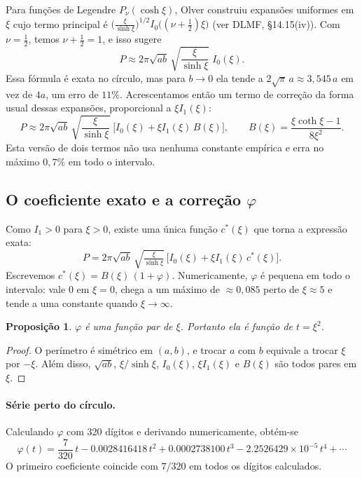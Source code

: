 \documentclass[11pt,a4paper]{article}
\newtheorem{proposicao}[teorema]{Proposição}
\theoremstyle{remark}
\begin{document}
Para funções de Legendre $P_\nu(\cosh\xi)$, Olver construiu expansões
uniformes em $\xi$ cujo termo principal é
$\big(\frac{\xi}{\sinh\xi}\big)^{1/2}I_0\big((\nu+\tfrac12)\xi\big)$
(ver DLMF, \S14.15(iv)). Com $\nu=\frac12$, temos $\nu+\frac12=1$, e isso sugere
\begin{equation}\label{eq:olver1}
P\approx2\pi\sqrt{ab}\,\sqrt{\frac{\xi}{\sinh\xi}}\;I_0(\xi).
\end{equation}
Essa fórmula é exata no círculo, mas para $b\to0$ ela tende a $2\sqrt\pi\,a\approx3{,}545\,a$
em vez de $4a$, um erro de $11\%$. Acrescentamos então um termo de correção da forma usual
dessas expansões, proporcional a $\xi I_1(\xi)$:
\begin{equation}\label{eq:olver2}
P\approx2\pi\sqrt{ab}\,\sqrt{\frac{\xi}{\sinh\xi}}\;\Big[I_0(\xi)+\xi I_1(\xi)\,B(\xi)\Big],
\qquad B(\xi)=\frac{\xi\coth\xi-1}{8\xi^2}.
\end{equation}
Esta versão de dois termos não usa nenhuma constante empírica e erra no máximo
$0{,}7\%$ em todo o intervalo.

\subsection{O coeficiente exato e a correção \texorpdfstring{$\varphi$}{phi}}

Como $I_1>0$ para $\xi>0$, existe uma única função $c^*(\xi)$ que torna a
expressão exata:
\[
P=2\pi\sqrt{ab}\,\sqrt{\tfrac{\xi}{\sinh\xi}}\,\big[I_0(\xi)+\xi I_1(\xi)\,c^*(\xi)\big].
\]
Escrevemos $c^*(\xi)=B(\xi)\,(1+\varphi)$. Numericamente, $\varphi$ é pequena em
todo o intervalo: vale $0$ em $\xi=0$, chega a um máximo de $\approx0{,}085$ perto de $\xi\approx5$ e
tende a uma constante quando $\xi\to\infty$.

\begin{proposicao}\label{prop:par}
$\varphi$ é uma função par de $\xi$. Portanto ela é função de $t=\xi^2$.
\end{proposicao}
\begin{proof}
O perímetro é simétrico em $(a,b)$, e trocar $a$ com $b$ equivale a trocar $\xi$ por $-\xi$.
Além disso, $\sqrt{ab}$, $\xi/\sinh\xi$, $I_0(\xi)$, $\xi I_1(\xi)$ e $B(\xi)$ são todos pares em $\xi$.
\end{proof}

\paragraph{Série perto do círculo.} Calculando $\varphi$ com 320 dígitos e
derivando numericamente, obtém-se
\begin{equation}
\varphi(t)=\frac{7}{320}\,t-0.0028416418\,t^2+0.0002738100\,t^3-2.2526429\times10^{-5}\,t^4+\cdots
\end{equation}
O primeiro coeficiente coincide com $7/320$ em todos os dígitos calculados.
\end{document}
